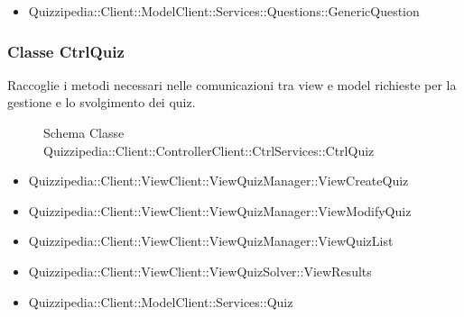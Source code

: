 \begin{itemize}
\item Quizzipedia::Client::ModelClient::Services::Questions::GenericQuestion
\end{itemize}
\subsubsection{Classe CtrlQuiz}
Raccoglie i metodi necessari nelle comunicazioni tra view e model richieste per la gestione e lo svolgimento dei quiz.
\begin{figure}[H]
\centering
\noindent{}
\caption{Schema Classe Quizzipedia::Client::ControllerClient::CtrlServices::CtrlQuiz}
\end{figure}
\begin{itemize}
\item Quizzipedia::Client::ViewClient::ViewQuizManager::ViewCreateQuiz
\item Quizzipedia::Client::ViewClient::ViewQuizManager::ViewModifyQuiz
\item Quizzipedia::Client::ViewClient::ViewQuizManager::ViewQuizList
\item Quizzipedia::Client::ViewClient::ViewQuizSolver::ViewResults
\end{itemize}
\begin{itemize}
\item Quizzipedia::Client::ModelClient::Services::Quiz
\end{itemize}
